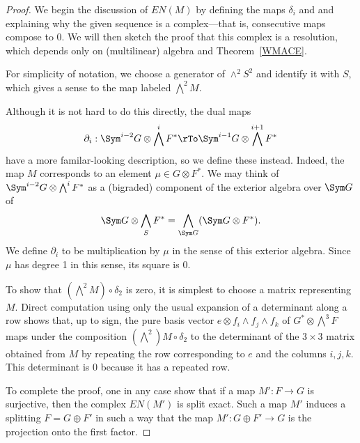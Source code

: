 \begin{proof} We begin the discussion of $EN(M)$ by defining the maps $\delta_i$ and and explaining why the given sequence is  a complex---that is, consecutive maps compose to 0. We will then sketch the proof that this complex is a resolution,
which depends only on (multilinear) algebra and Theorem~\ref{WMACE}. 

For simplicity of notation, we choose a generator of $\wedge^2 S^2$
 and identify it with $S$, which gives a sense to the map labeled $\bigwedge^2M$.
 
  Although it is not hard to do this directly, the dual maps
 $$
 \partial_i: \Sym^{i-2} G \otimes \bigwedge^i F^* \rTo \Sym^{i-1} G \otimes \bigwedge^{i+1} F^*
 $$
 have a more familar-looking description, so we define these instead. Indeed, the map $M$ corresponds to an
 element $\mu\in G\otimes F^*$. We may think of $ \Sym^{i-2} G \otimes \bigwedge^i  F^*$
 as a (bigraded) component of the exterior algebra over $ \Sym G$ of 
 $$
  \Sym G \otimes \bigwedge_S  F^*= \bigwedge_{ \Sym G} (\Sym G \otimes  F^*).
 $$
We define $\partial_i$ to be  multiplication by $\mu$ in the sense of this exterior algebra. Since $\mu$ has degree 1
in this sense, its square is 0. 

To show that $(\bigwedge^2 M)\circ \delta_2$ is zero, it is simplest to choose a matrix representing $M$.
Direct computation using only the usual expansion of a determinant
along a row shows that, up to sign, the
pure basis vector $e\otimes f_i\wedge f_j\wedge f_k$ of $G^*\otimes \bigwedge^3 F$
maps under the composition $(\bigwedge^2) M\circ \delta_2$ to the determinant
of the $3\times 3$ matrix obtained from $M$ by repeating the row corresponding to $e$ and
the columns $i,j,k$. This determinant is 0 because it has a repeated row.

To complete the proof, one in any case show that 
if a map $M': F\to G$ is surjective, then the complex $EN(M')$
is split exact. Such a map $M'$ induces a splitting $F = G\oplus F'$ in such a way that the map $M': G\oplus F' \to G$ is the projection onto the first factor. 


\end{proof}
